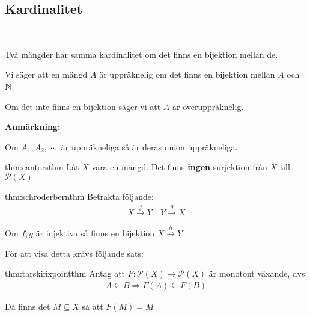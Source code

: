 \subsection{Kardinalitet}\hfill\\\par
\noindent Två mängder har samma kardinalitet om det finns en bijektion mellan de.
\par\bigskip
\noindent Vi säger att en mängd $A$ är uppräknelig om det finns en bijektion mellan $A$ och $\mathbb{N}$.\par
Om det inte finns en bijektion säger vi att $A$ är överuppräknelig.
\par\bigskip
\noindent\textbf{Anmärkning:}\par
\noindent Om $A_1,A_2,\cdots,$ är uppräkneliga så är deras union uppräkneliga.
\par\bigskip
\begin{theo}{thm:cantorsthm}
  Låt $X$ vara en mängd. Det finns \textbf{ingen} surjektion från $X$ till $\mathcal{P}(X)$ 
\end{theo}
\par\bigskip
\begin{theo}{thm:schroderbernthm}
  Betrakta följande:
  \begin{equation*}
    \begin{gathered}
      X\stackrel{f}{\to}Y\quad Y\stackrel{g}{\to}X
    \end{gathered}
  \end{equation*}\par
  \noindent Om $f,g$ är injektiva så finns en bijektion $X\stackrel{h}{\to}Y$
\end{theo}
\par\bigskip
\noindent För att visa detta krävs följande sats:
\par\bigskip
\begin{theo}{thm:tarskifixpointthm}
  Antag att $F:\mathcal{P}(X)\to\mathcal{P}(X)$ är monotont växande, dvs
  \begin{equation*}
    \begin{gathered}
      A\subseteq B\Rightarrow F(A)\subseteq F(B)
    \end{gathered}
  \end{equation*}\par
  \noindent Då finns det $M\subseteq X$ så att $F(M) = M$
\end{theo}
